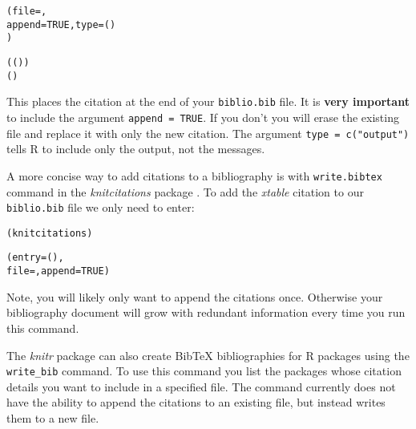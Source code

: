 \begin{knitrout}
\color{fgcolor}\begin{kframe}
\begin{alltt}
(file = , 
     append = TRUE, type = ()
     )      

(()) 
()
\end{alltt}
\end{kframe}
\end{knitrout}


\noindent This places the citation at the end of your \texttt{biblio.bib} file. It is \textbf{very important} to include the argument \texttt{append = TRUE}. If you don't you will erase the existing file and replace it with only the new citation. The argument \texttt{type = c("output")} tells R to include only the output, not the messages.

A more concise way to add citations to a bibliography is with \texttt{write.bibtex} command in the \emph{knitcitations} package \cite[]{R-knitcitations}. To add the \emph{xtable} citation to our \texttt{biblio.bib} file we only need to enter:

\begin{knitrout}
\color{fgcolor}\begin{kframe}
\begin{alltt}
(knitcitations)
 
(entry = (), 
              file = , append = TRUE)
\end{alltt}
\end{kframe}
\end{knitrout}


\noindent Note, you will likely only want to append the citations once. Otherwise your bibliography document will grow with redundant information every time you run this command.

The {\emph{knitr}} package can also create BibTeX bibliographies for R packages using the \texttt{write\_bib} command. To use this command you list the packages whose citation details you want to include in a specified file. The command currently does not have the ability to append the citations to an existing file, but instead writes them to a new file.

